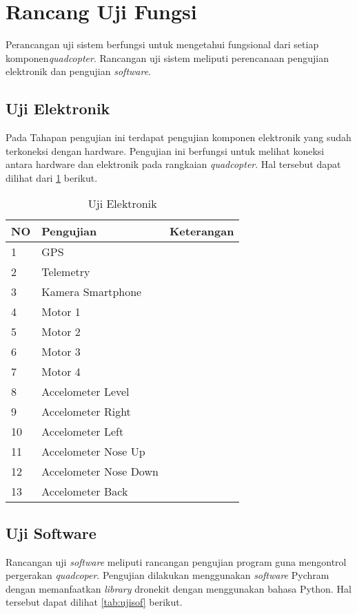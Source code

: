 \section{Rancang Uji Fungsi}
Perancangan uji sistem berfungsi untuk mengetahui fungsional dari setiap komponen\textit{quadcopter}. Rancangan uji sistem meliputi perencanaan pengujian elektronik dan pengujian \textit{software}.
\subsection{Uji Elektronik}
Pada Tahapan pengujian ini terdapat pengujian komponen elektronik yang sudah terkoneksi dengan hardware. Pengujian ini berfungsi untuk melihat koneksi antara hardware dan elektronik pada rangkaian \textit{quadcopter}. Hal tersebut dapat dilihat dari  \cref{tab:ujiel} berikut.


\begin{table}[h]
	\caption{Uji Elektronik}
	\label{tab:ujiel}
	\centering
	\begin{tabular}{|l|l|l|}
		\hline
		NO & Pengujian & Keterangan \\ \hline
		1 & GPS &  \\ \hline
		2 & Telemetry &  \\ \hline
		3 & Kamera Smartphone &  \\ \hline
		4 & Motor 1 &  \\ \hline
		5 & Motor 2 &  \\ \hline
		6 & Motor 3 &  \\ \hline
		7 & Motor 4 &  \\ \hline
		8 & Accelometer Level &  \\ \hline
		9 & Accelometer Right &  \\ \hline
		10 & Accelometer Left &  \\ \hline
		11 & Accelometer Nose Up &  \\ \hline
		12 & Accelometer Nose Down &  \\ \hline
		13 & Accelometer Back &  \\ \hline
	\end{tabular}
\end{table}

\subsection{Uji Software}
Rancangan uji \textit{software} meliputi rancangan pengujian program guna mengontrol pergerakan \textit{quadcoper}. Pengujian dilakukan menggunakan \textit{software} Pychram dengan memanfaatkan \textit{library} dronekit dengan menggunakan bahasa Python. Hal tersebut dapat dilihat \cref{tab:ujisof} berikut.

